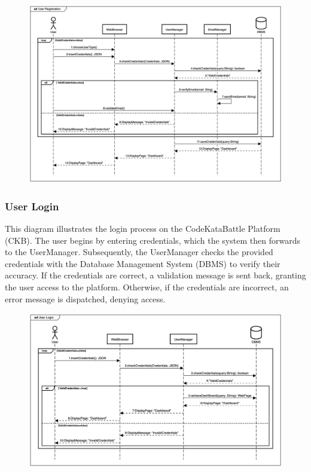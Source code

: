 \documentclass[12pt,oneside,a4paper]{article}
\begin{document}
\begin{figure}[htbp]
    \centering
     \includegraphics[width=1\linewidth]{Images/Sequence Diagrams/UserRegistration.png}
    \label{fig:enter-label}
\end{figure}

\clearpage

\subsubsection{User Login}
This diagram illustrates the login process on the CodeKataBattle Platform (CKB). The user begins by entering credentials, which the system then forwards to the UserManager. Subsequently, the UserManager checks the provided credentials with the Database Management System (DBMS) to verify their accuracy. If the credentials are correct, a validation message is sent back, granting the user access to the platform. Otherwise, if the credentials are incorrect, an error message is dispatched, denying access.

\begin{figure}[htbp]
    \centering
    \includegraphics[width=1\linewidth]{Images/Sequence Diagrams/UserLogin.png}
    \label{fig:enter-label}
\end{figure}
\end{document}
